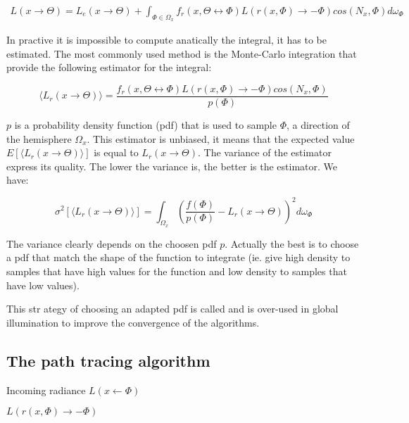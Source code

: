 \begin{align*}
L(x \rightarrow \Theta) = L_e(x \rightarrow \Theta) + \int_{\Phi \in \Omega_x} f_r(x, \Theta \leftrightarrow \Phi) L(r(x, \Phi) \rightarrow -\Phi) cos(N_x, \Phi) d\omega_\Phi
\end{align*}

In practive it is impossible to compute anatically the integral, it has to be estimated. The most commonly used method is the Monte-Carlo integration that provide the following estimator for the integral:

\begin{equation*}
\langle L_r(x \rightarrow \Theta) \rangle = \frac{f_r(x, \Theta \leftrightarrow \Phi) L(r(x, \Phi) \rightarrow -\Phi) cos(N_x, \Phi)}{p(\Phi)}
\end{equation*}

$p$ is a probability density function (pdf) that is used to sample $\Phi$, a direction of the hemisphere $\Omega_x$. This estimator is unbiased, it means that the expected value $E[\langle L_r(x \rightarrow \Theta) \rangle]$ is equal to $L_r(x \rightarrow \Theta)$. The variance of the estimator express its quality. The lower the variance is, the better is the estimator. We have:

\begin{equation*}
\sigma^2[\langle L_r(x \rightarrow \Theta) \rangle] = \int_{\Omega_x} (\frac{f(\Phi)}{p(\Phi)} - L_r(x \rightarrow \Theta))^2 d\omega_\Phi
\end{equation*}

The variance clearly depends on the choosen pdf $p$. Actually the best is to choose a pdf that match the shape of the function to integrate (ie. give high density to samples that have high values for the function and low density to samples that have low values).

This str	ategy of choosing an adapted pdf is called  and is over-used in global illumination to improve the convergence of the algorithms.

\subsection{The path tracing algorithm}

\begin{algorithm}[h!]
\label{algo::incoming_radiance}
\caption[incoming_radiance]{Incoming radiance $L(x \leftarrow \Phi)$}
\Return $L(r(x, \Phi) \rightarrow -\Phi)$\;
\end{algorithm}

